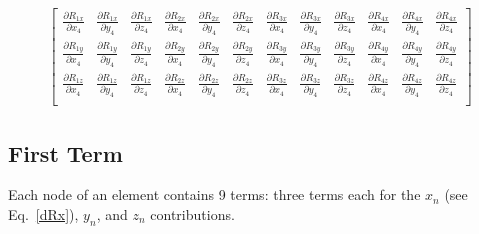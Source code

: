 \begin{eqnarray}
\begin{bmatrix}
\frac{\partial R_{1x}}{\partial x_4} & \frac{\partial R_{1x}}{\partial y_4} & \frac{\partial R_{1x}}{\partial z_4} & \frac{\partial R_{2x}}{\partial x_4} & \frac{\partial R_{2x}}{\partial y_4} & \frac{\partial R_{2x}}{\partial z_4} & \frac{\partial R_{3x}}{\partial x_4} & \frac{\partial R_{3x}}{\partial y_4} & \frac{\partial R_{3x}}{\partial z_4} & \frac{\partial R_{4x}}{\partial x_4} & \frac{\partial R_{4x}}{\partial y_4} & \frac{\partial R_{4x}}{\partial z_4} \\
\frac{\partial R_{1y}}{\partial x_4} & \frac{\partial R_{1y}}{\partial y_4} & \frac{\partial R_{1y}}{\partial z_4} & \frac{\partial R_{2y}}{\partial x_4} & \frac{\partial R_{2y}}{\partial y_4} & \frac{\partial R_{2y}}{\partial z_4} & \frac{\partial R_{3y}}{\partial x_4} & \frac{\partial R_{3y}}{\partial y_4} & \frac{\partial R_{3y}}{\partial z_4} & \frac{\partial R_{4y}}{\partial x_4} & \frac{\partial R_{4y}}{\partial y_4} & \frac{\partial R_{4y}}{\partial z_4} \\
\frac{\partial R_{1z}}{\partial x_4} & \frac{\partial R_{1z}}{\partial y_4} & \frac{\partial R_{1z}}{\partial z_4} & \frac{\partial R_{2z}}{\partial x_4} & \frac{\partial R_{2z}}{\partial y_4} & \frac{\partial R_{2z}}{\partial z_4} & \frac{\partial R_{3z}}{\partial x_4} & \frac{\partial R_{3z}}{\partial y_4} & \frac{\partial R_{3z}}{\partial z_4} & \frac{\partial R_{4z}}{\partial x_4} & \frac{\partial R_{4z}}{\partial y_4} & \frac{\partial R_{4z}}{\partial z_4} \\
\end{bmatrix}
\end{eqnarray}
%

\subsection{First Term}

Each node of an element contains 9 terms: three terms each for the $x_n$ (see Eq.\ \eqref{dRx}), $y_n$, and $z_n$ contributions. 

